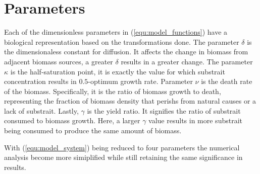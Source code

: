 \section{Parameters}

Each of the dimensionless parameters in (\ref{equ:model_functions}) have a biological representation based on the transformations done.
The parameter $\delta$ is the dimensionaless constant for diffusion.
It affects the change in biomass from adjacent biomass sources, a greater $\delta$ results in a greater change.
The parameter $\kappa$ is the half-saturation point, it is exactly the value for which substrait concentration results in $0.5$-optimum growth rate.
Parameter $\nu$ is the death rate of the biomass.
Specifically, it is the ratio of biomass growth to death, representing the fraction of biomass density that perishs from natural causes or a lack of substrait.
Lastly, $\gamma$ is the yield ratio.
It signifies the ratio of substrait consumed to biomass growth.
Here, a larger $\gamma$ value results in more substrait being consumed to  produce the same amount of biomass. 

With (\ref{equ:model_system}) being reduced to four parameters the numerical analysis become more simiplified while still retaining the same significance in results.
